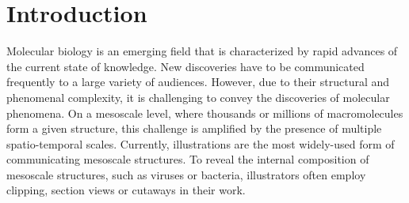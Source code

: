 \section{Introduction}\label{sec:intro}

Molecular biology is an emerging field that is characterized by rapid advances of the current state of knowledge.
New discoveries have to be communicated frequently to a large variety of audiences.
However, due to their structural and phenomenal complexity, it is challenging to convey the discoveries of molecular phenomena. On a mesoscale level, where thousands or millions of macromolecules form a given structure, this challenge is amplified by the presence of multiple spatio-temporal scales. Currently, illustrations are the most widely-used form of communicating mesoscale structures. To reveal the internal composition of mesoscale structures, such as viruses or bacteria, illustrators often employ clipping, section views or cutaways in their work.



